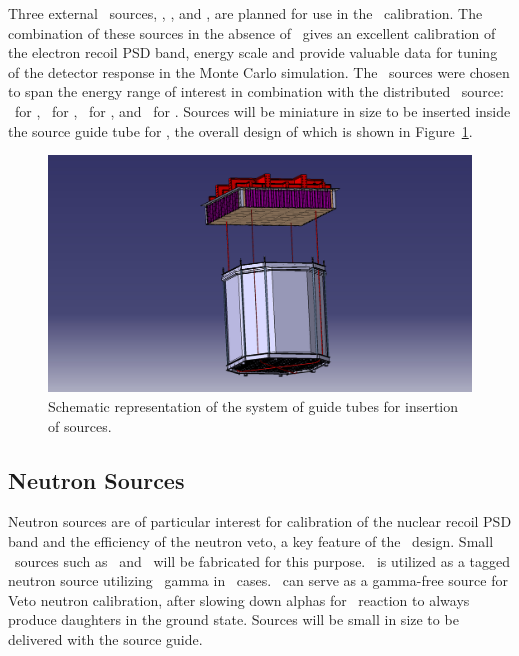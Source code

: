 Three external \gr\ sources, , \Ba, and \Cs, are planned for use in the \TPC\ calibration. The combination of these sources in the absence of \ArThirtyNine\ gives an excellent calibration of the electron recoil PSD band, energy scale and provide valuable data for tuning of the detector response in the Monte Carlo simulation. The \gr\ sources were chosen to span the energy range of interest in combination with the distributed \Kr\ source: \KrEightThreeMOneTwoECEnergy\ for \Kr, \CoEnergy\ for , \BaEnergy\ for \Ba, and \CsEnergy\ for \Cs.  Sources will be miniature in size to be inserted inside the source guide tube for \TPC, the overall design of which is shown in Figure~\ref{fig:Calibration-OverallSystemDesign}.

\begin{figure}[t!]
\includegraphics[width=\textwidth]{./Figures/TPC_calibration_system2.jpg}
\caption[Schematic of the sources insertion system]{Schematic representation of the system of guide tubes for insertion of sources.}
\label{fig:Calibration-OverallSystemDesign}
\end{figure}


\subsection{Neutron Sources}

Neutron sources are of particular interest for calibration of the nuclear recoil PSD band and the efficiency of the neutron veto, a key feature of the \DSks\ design.  Small \alphan\ sources such as \AmBe\ and \AmC\ will be fabricated for this purpose. \AmBe\ is utilized as a tagged neutron source utilizing \AmBeGammaEnergy\ gamma in \AmTwoFourOneGammaTwoBR\ cases. \AmC\ can serve as a gamma-free source for Veto neutron calibration, after slowing down alphas for \alphan\ reaction to always produce daughters in the ground state. Sources will be small in size to be delivered with the source guide. 

